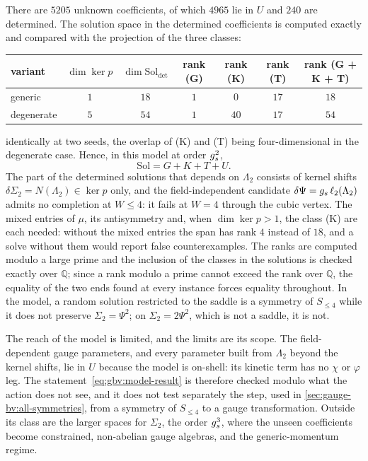 There are $5205$ unknown coefficients, of which $4965$ lie in $U$ and $240$ are determined.
The solution space in the determined coefficients is computed exactly and compared with the projection of the three classes:
\begin{center}
  \begin{tabular}{lcccccc}
    \toprule
    variant & $\dim \ker p$ & $\dim \mathrm{Sol}_{\mathrm{det}}$ & rank (G) & rank (K) & rank (T) & rank (G + K + T) \\
    \midrule
    generic & $1$ & $18$ & $1$ & $0$ & $17$ & $18$ \\
    degenerate & $5$ & $54$ & $1$ & $40$ & $17$ & $54$ \\
    \bottomrule
  \end{tabular}
\end{center}
identically at two seeds, the overlap of (K) and (T) being four-dimensional in the degenerate case.
Hence, in this model at order $g_s^2$,
\begin{equation}
  \label{eq:gbv:model-result}
  \mathrm{Sol}
    = G + K + T + U.
\end{equation}
The part of the determined solutions that depends on $\Lambda_2$ consists of kernel shifts $\delta \Sigma_2 = N(\Lambda_2) \in \ker p$ only, and the field-independent candidate $\delta \Psi = g_s \, \ell_2(\Lambda_2)$ admits no completion at $W \le 4$: it fails at $W = 4$ through the cubic vertex.
The mixed entries of $\mu$, its antisymmetry and, when $\dim \ker p > 1$, the class (K) are each needed: without the mixed entries the span has rank $4$ instead of $18$, and a solve without them would report false counterexamples.
The ranks are computed modulo a large prime and the inclusion of the classes in the solutions is checked exactly over $\mathbb Q$; since a rank modulo a prime cannot exceed the rank over $\mathbb Q$, the equality of the two ends found at every instance forces equality throughout.
In the model, a random solution restricted to the saddle is a symmetry of $S_{\le 4}$ while it does not preserve $\Sigma_2 = \Psi^2$; on $\Sigma_2 = 2 \Psi^2$, which is not a saddle, it is not.

The reach of the model is limited, and the limits are its scope.
The field-dependent gauge parameters, and every parameter built from $\Lambda_2$ beyond the kernel shifts, lie in $U$ because the model is on-shell: its kinetic term has no $\chi$ or $\varphi$ leg.
The statement~\eqref{eq:gbv:model-result} is therefore checked modulo what the action does not see, and it does not test separately the step, used in \cref{sec:gauge-bv:all-symmetries}, from a symmetry of $S_{\le 4}$ to a gauge transformation.
Outside its class are the larger spaces for $\Sigma_2$, the order $g_s^3$, where the unseen coefficients become constrained, non-abelian gauge algebras, and the generic-momentum regime.

